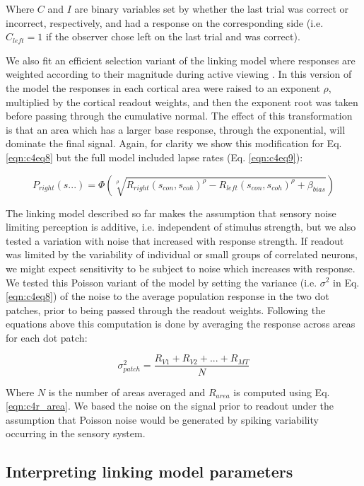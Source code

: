 \documentclass{report}
\begin{document}
Where $C$ and $I$ are binary variables set by whether the last trial was correct or incorrect, respectively, and had a response on the corresponding side (i.e. $C_{left}=1$ if the observer chose left on the last trial and was correct).  

We also fit an efficient selection variant of the linking model where responses are weighted according to their magnitude during active viewing \citep{Hara2014-mv,Pestilli2011-gi}. In this version of the model the responses in each cortical area were raised to an exponent $\rho$, multiplied by the cortical readout weights, and then the exponent root was taken before passing through the cumulative normal. The effect of this transformation is that an area which has a larger base response, through the exponential, will dominate the final signal. Again, for clarity we show this modification for Eq. \ref{eqn:c4eq8} but the full model included lapse rates (Eq. \ref{eqn:c4eq9}):

\begin{equation}
    P_{right}(s...)=\Phi(\sqrt[\rho]{R_{right}(s_{con},s_{coh})^{\rho}-R_{left}(s_{con},s_{coh})^{\rho}+\beta_{bias}})
\end{equation}

The linking model described so far makes the assumption that sensory noise limiting perception is additive, i.e. independent of stimulus strength, but we also tested a variation with noise that increased with response strength. If readout was limited by the variability of individual or small groups of correlated neurons, we might expect sensitivity to be subject to noise which increases with response. We tested this Poisson variant of the model by setting the variance (i.e. $\sigma^2$ in Eq. \ref{eqn:c4eq8}) of the noise to the average population response in the two dot patches, prior to being passed through the readout weights. Following the equations above this computation is done by averaging the response across areas for each dot patch:

\begin{equation}
    \sigma_{patch}^2=\frac{R_{V1}+R_{V2}+...+R_{MT}}{N}
\end{equation}

Where $N$ is the number of areas averaged and $R_{area}$ is computed using Eq. \ref{eqn:c4r_area}. We based the noise on the signal prior to readout under the assumption that Poisson noise would be generated by spiking variability occurring in the sensory system.

\subsection{Interpreting linking model parameters}
\end{document}

